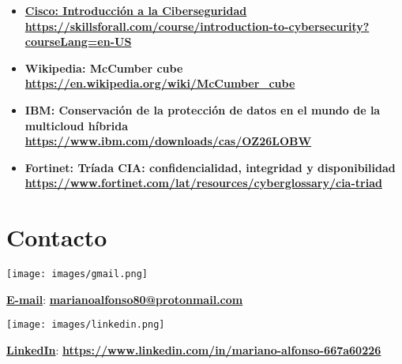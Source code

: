 \documentclass[a4paper]{article} %
\begin{document}
    \begin{itemize}
        \item \href{https://skillsforall.com/course/introduction-to-cybersecurity?courseLang=en-US}{\textbf{\color{black}Cisco: Introducción a la Ciberseguridad}} \\
        \href{https://skillsforall.com/course/introduction-to-cybersecurity?courseLang=en-US}{\textbf{\color{blue}https://skillsforall.com/course/introduction-to-cybersecurity?courseLang=en-US}}
        \item \textbf{Wikipedia: McCumber cube} \\
        \href{https://en.wikipedia.org/wiki/McCumber_cube}{\textbf{\color{blue}https://en.wikipedia.org/wiki/McCumber\_cube}}
        \item \textbf{IBM: Conservación de la protección de datos
        en el mundo de la multicloud híbrida} \\
        \href{https://www.ibm.com/downloads/cas/OZ26LOBW}{\textbf{\color{blue}https://www.ibm.com/downloads/cas/OZ26LOBW}}
        \item \textbf{Fortinet: Tríada CIA: confidencialidad, integridad y disponibilidad} \\
        \href{https://www.fortinet.com/lat/resources/cyberglossary/cia-triad}{\textbf{\color{blue}https://www.fortinet.com/lat/resources/cyberglossary/cia-triad}}
    \end{itemize}   
    
\section{Contacto}

\begin{minipage}{0.05\textwidth}
  \texttt{[image: images/gmail.png]} 
\end{minipage}
\begin{minipage}{.7\textwidth}
    \vspace{1mm} %
    \href{mailto:marianoalfonso80@protonmail.com}{\textbf{\color{black}E-mail}}: \href{mailto:marianoalfonso80@protonmail.com}{\textbf{\color{blue}marianoalfonso80@protonmail.com}}
\end{minipage} 

\begin{minipage}{0.05\textwidth}
    \texttt{[image: images/linkedin.png]} 
\end{minipage}
\begin{minipage}{.7\textwidth}
    \vspace{1mm} %
    \href{https://www.linkedin.com/in/mariano-alfonso-667a60226}{\textbf{\color{black}LinkedIn}}: \href{https://www.linkedin.com/in/mariano-alfonso-667a60226}{\textbf{\color{blue}https://www.linkedin.com/in/mariano-alfonso-667a60226}}
\end{minipage} 
\end{document}

